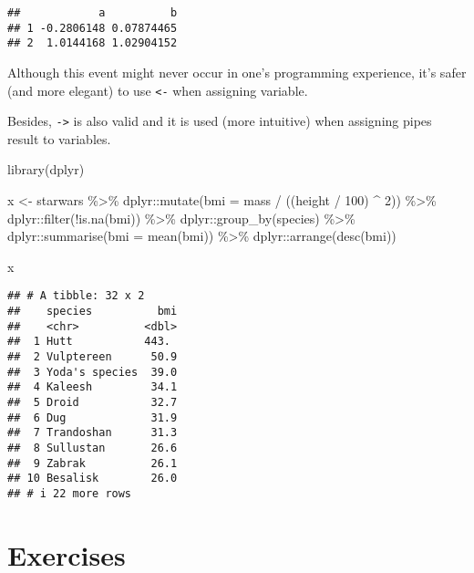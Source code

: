 \documentclass[
  oneside]{book}
\newenvironment{Shaded}{\begin{snugshade}}{\end{snugshade}}
\newcommand{\AttributeTok}[1]{\textcolor[rgb]{0.77,0.63,0.00}{#1}}
\newcommand{\DecValTok}[1]{\textcolor[rgb]{0.00,0.00,0.81}{#1}}
\newcommand{\FunctionTok}[1]{\textcolor[rgb]{0.00,0.00,0.00}{#1}}
\newcommand{\NormalTok}[1]{#1}
\newcommand{\OtherTok}[1]{\textcolor[rgb]{0.56,0.35,0.01}{#1}}
\newcommand{\SpecialCharTok}[1]{\textcolor[rgb]{0.00,0.00,0.00}{#1}}
\begin{document}
\begin{verbatim}
##            a          b
## 1 -0.2806148 0.07874465
## 2  1.0144168 1.02904152
\end{verbatim}

Although this event might never occur in one's programming experience, it's
safer (and more elegant) to use \texttt{\textless{}-} when assigning variable.

Besides, \texttt{-\textgreater{}} is also valid and it is used (more intuitive) when assigning pipes
result to variables.

\begin{Shaded}
\begin{Highlighting}[]
\FunctionTok{library}\NormalTok{(dplyr)}

\NormalTok{x }\OtherTok{\textless{}{-}}\NormalTok{ starwars }\SpecialCharTok{\%\textgreater{}\%}
\NormalTok{  dplyr}\SpecialCharTok{::}\FunctionTok{mutate}\NormalTok{(}\AttributeTok{bmi =}\NormalTok{ mass }\SpecialCharTok{/}\NormalTok{ ((height }\SpecialCharTok{/} \DecValTok{100}\NormalTok{) }\SpecialCharTok{\^{}} \DecValTok{2}\NormalTok{)) }\SpecialCharTok{\%\textgreater{}\%}
\NormalTok{  dplyr}\SpecialCharTok{::}\FunctionTok{filter}\NormalTok{(}\SpecialCharTok{!}\FunctionTok{is.na}\NormalTok{(bmi)) }\SpecialCharTok{\%\textgreater{}\%}
\NormalTok{  dplyr}\SpecialCharTok{::}\FunctionTok{group\_by}\NormalTok{(species) }\SpecialCharTok{\%\textgreater{}\%}
\NormalTok{  dplyr}\SpecialCharTok{::}\FunctionTok{summarise}\NormalTok{(}\AttributeTok{bmi =} \FunctionTok{mean}\NormalTok{(bmi)) }\SpecialCharTok{\%\textgreater{}\%}
\NormalTok{  dplyr}\SpecialCharTok{::}\FunctionTok{arrange}\NormalTok{(}\FunctionTok{desc}\NormalTok{(bmi))}

\NormalTok{x}
\end{Highlighting}
\end{Shaded}

\begin{verbatim}
## # A tibble: 32 x 2
##    species          bmi
##    <chr>          <dbl>
##  1 Hutt           443. 
##  2 Vulptereen      50.9
##  3 Yoda's species  39.0
##  4 Kaleesh         34.1
##  5 Droid           32.7
##  6 Dug             31.9
##  7 Trandoshan      31.3
##  8 Sullustan       26.6
##  9 Zabrak          26.1
## 10 Besalisk        26.0
## # i 22 more rows
\end{verbatim}

\hypertarget{exercises}{%
\section{Exercises}\label{exercises}}
\end{document}
